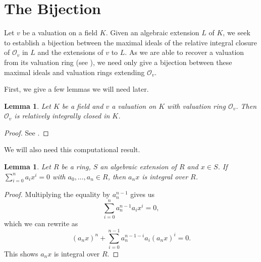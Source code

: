 \documentclass[12pt,a4paper]{amsart}
\newtheorem{lem}[thm]{Lemma}
\theoremstyle{definition}
\begin{document}
\section{The Bijection}
Let $v$ be a valuation on a field $K$.
Given an algebraic extension $L$ of $K$, we seek to establish a bijection between the maximal ideals of the relative integral closure of $\mathcal{O}_v$ in $L$ and the extensions of $v$ to $L$.
As we are able to recover a valuation from its valuation ring (see \cite[Proposition 2.1.2]{engler2005valued}), we need only give a bijection between these maximal ideals and valuation rings extending $\mathcal{O}_v$.

First, we give a few lemmas we will need later.
\begin{lem}{\label{cl}}
Let $K$ be a field and $v$ a valuation on $K$ with valuation ring $\mathcal{O}_v$.
Then $\mathcal{O}_v$ is relatively integrally closed in $K$.
\end{lem}
\begin{proof}
See .
\end{proof}
We will also need this computational result.
\begin{lem}{\label{ax}}
Let $R$ be a ring, $S$ an algebraic extension of $R$ and \hbox{$x\in S$.}
If $\sum_{i=0}^na_ix^i=0$ with $a_0,\ldots,a_n\in R$, then $a_nx$ is integral over $R$.
\end{lem}
\begin{proof}
Multiplying the equality by $a_n^{n-1}$ gives us
$$\sum_{i=0}^na_n^{n-1}a_ix^i=0,$$
which we can rewrite as
$$(a_nx)^n+\sum_{i=0}^{n-1}a_n^{n-1-i}a_i(a_nx)^i=0.$$
This shows $a_nx$ is integral over $R$.
\end{proof}
\end{document}
